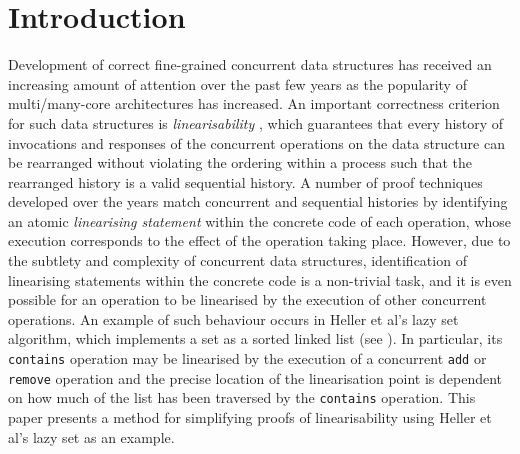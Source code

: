 \documentclass{article}
\theoremstyle{plain}
\newcounter{thm}
\theoremstyle{definition}
\begin{document}
\section{Introduction}
\label{sec:intro}
Development of correct fine-grained concurrent data structures has
received an increasing amount of attention over the past few years as
the popularity of multi/many-core architectures has increased. An
important correctness criterion for such data structures is
\emph{linearisability} \cite{Herlihy90}, which guarantees that every
history of invocations and responses of the concurrent operations on
the data structure can be rearranged without violating the ordering
within a process such that the rearranged history is a valid
sequential history. A number of proof techniques developed over the years match concurrent
and sequential histories by identifying an atomic \emph{linearising
  statement} within the concrete code of each operation, whose
execution corresponds to the effect of the operation taking place.
However, due to the subtlety and complexity of concurrent data
structures, identification of linearising statements within the
concrete code is a non-trivial task, and it is even possible for an
operation to be linearised by the execution of other concurrent
operations. An example of such behaviour occurs in Heller et al's lazy
set algorithm, which implements a set as a sorted linked list
\cite{HHLMSS07} (see ). In particular, its {\tt
  contains} operation may be linearised by the execution of a
concurrent {\tt add} or {\tt remove} operation and the precise
location of the linearisation point is dependent on how much of the
list has been traversed by the {\tt contains} operation.  This paper
presents a method for simplifying proofs of linearisability using
Heller et al's lazy set as an example.
\end{document}
